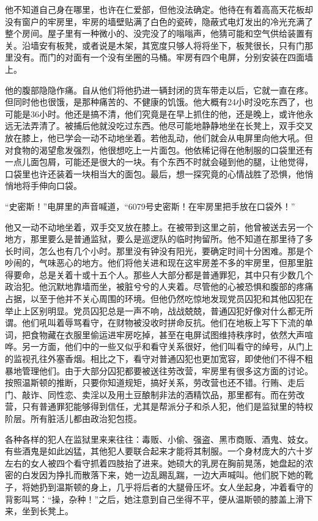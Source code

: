 他不知道自己身在哪里，也许在仁爱部，但他没法确定。他待在有着高高天花板却没有窗户的牢房里，牢房的墙壁贴满了白色的瓷砖，隐蔽式电灯发出的冷光充满了整个房间。屋子里有一种微小的、没完没了的嗡嗡声，他猜可能和空气供给装置有关。沿墙安有板凳，或者说是木架，其宽度只够人将将坐下，板凳很长，只有门那里没有。而门的对面有一个没有坐圈的马桶。牢房有四个电屏，分别安装在四面墙上。

他的腹部隐隐作痛。自从他们将他扔进一辆封闭的货车带走以后，它就一直在疼。但同时他也很饿，是那种痛苦的、不健康的饥饿。他大概有24小时没吃东西了，也可能是36小时。他还是搞不清，他们究竟是在早上抓住的他，还是晚上，或许他永远无法弄清了。被捕后他就没吃过东西。他尽可能地静静地坐在长凳上，双手交叉放在膝上，他已学会一动不动地坐着。若他乱动，他们就会从电屏里向他大吼。但对食物的渴望愈发强烈，他很想吃上一片面包。他依稀记得在他制服的口袋里还有一点儿面包屑，可能还是很大的一块。有个东西不时就会碰到他的腿，让他觉得，口袋里也许还装着一块相当大的面包。最后，想一探究竟的心情战胜了恐惧，他悄悄地将手伸向口袋。

``史密斯！''电屏里的声音喊道，``6079号史密斯！在牢房里把手放在口袋外！''

他又一动不动地坐着，双手交叉放在膝上。在被带到这里之前，他曾被送去另一个地方，那里要么是普通监狱，要么是巡逻队的临时拘留所。他不知道在那里待了多长时间，怎么也有几个小时。那里没有钟没有阳光，要确定时间十分困难。那是个吵闹的，气味恶心的地方。他们将他关进和现在这牢房差不多的牢房里，但那里脏得要命，总是关着十或十五个人。那些人大部分都是普通罪犯，其中只有少数几个政治犯。他沉默地靠墙而坐，被脏兮兮的人夹着。尽管他的心被恐惧和腹部的疼痛占据，以至于他并不关心周围的环境。但他仍然吃惊地发现党员囚犯和其他囚犯在举止上区别明显。党员囚犯总是一声不响，战战兢兢，普通囚犯好像对什么都无所谓。他们吼叫着辱骂看守，在财物被没收时拼命反抗。他们在地板上写下下流的单词，把食物藏在衣服里偷运进牢房吃掉，甚至在电屏试图维持秩序时，依然大声喧哗。另一方面，他们中的一些又似乎和看守关系很好，他们叫看守的绰号，从门上的监视孔往外塞香烟。相比之下，看守对普通囚犯也更加宽容，即使他们不得不粗暴地管理他们。由于大部分囚犯都要被送往劳改营，牢房里有很多这方面的讨论。按照温斯顿的推断，只要你知道规矩，搞好关系，劳改营也还不错。行贿、走后门、敲诈、同性恋、卖淫以及用土豆酿制非法的酒精饮品，那里都有。而在劳改营，只有普通罪犯能够得到信任，尤其是帮派分子和杀人犯，他们是监狱里的特权阶层。所有脏活儿都由政治犯包揽。

各种各样的犯人在监狱里来来往往：毒贩、小偷、强盗、黑市商贩、酒鬼、妓女。有些酒鬼是如此凶猛，其他犯人要联合起来才能将其制服。一个身材庞大的六十岁左右的女人被四个看守抓着四肢抬了进来。她硕大的乳房在胸前晃荡，她盘起的浓密的白发因为挣扎而散落下来，她一边乱踢乱踹，一边大声喊叫。他们脱下她的靴子，将她扔到温斯顿的身上，几乎将后者的大腿骨压坏。女人坐起身，冲着看守的背影叫骂：``操，杂种！''之后，她注意到自己坐得不平，便从温斯顿的膝盖上滑下来，坐到长凳上。

